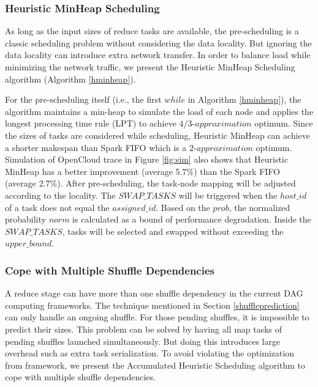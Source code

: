 \subsubsection{Heuristic MinHeap Scheduling}\label{h-minheap}

As long as the input sizes of reduce tasks are available, the pre-scheduling is a classic scheduling problem without considering the data locality. 
But ignoring the data locality can introduce extra network transfer. 
In order to balance load while minimizing the network traffic, we present the Heuristic MinHeap Scheduling algorithm (Algorithm \ref{hminheap}).   

For the pre-scheduling itself (i.e., the first $while$ in Algorithm \ref{hminheap}), the algorithm maintains a min-heap to simulate the load of each node 
and applies the longest processing time rule (LPT) \cite{design} to achieve $4/3\text{-}approximation$ optimum. 
Since the sizes of tasks are considered while scheduling, Heuristic MinHeap can achieve a shorter makespan than Spark FIFO which is a $2\text{-}approximation$ optimum. 
Simulation of OpenCloud trace in Figure \ref{fig:sim} also shows that Heuristic MinHeap has a better improvement (average 5.7\%) than the Spark FIFO (average 2.7\%).
After pre-scheduling, the task-node mapping will be adjusted according to the locality. 
The $SWAP\_TASKS$ will be triggered when the $host\_id$ of a task does not equal the $assigned\_id$.
Based on the $prob$, the normalized probability $norm$ is calculated as a bound of performance degradation. 
Inside the $SWAP\_TASKS$, tasks will be selected and swapped without exceeding the $upper\_bound$. 

\subsubsection{Cope with Multiple Shuffle Dependencies}
A reduce stage can have more than one shuffle dependency in the current DAG computing frameworks. 
The technique mentioned in Section \ref{shuffleprediction} can only handle an ongoing shuffle. 
For those pending shuffles, it is impossible to predict their sizes. 
This problem can be solved by having all map tasks of pending shuffles launched simultaneously. 
But doing this introduces large overhead such as extra task serialization. 
To avoid violating the optimization from framework, we present the Accumulated Heuristic Scheduling algorithm to cope with multiple shuffle dependencies.

